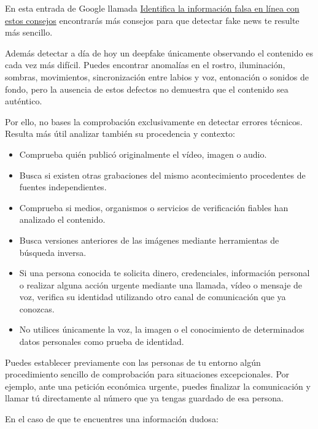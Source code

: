 \documentclass[
  spanish,
  a4paper,
  openany]{book}
\begin{document}
En esta entrada de Google llamada \href{https://blog.google/products-and-platforms/products/news/consejos-verificacion-hechos/}{Identifica la información falsa en línea con estos consejos} encontrarás más consejos para que detectar fake news te resulte más sencillo.

Además detectar a día de hoy un deepfake únicamente observando el contenido es cada vez más difícil. Puedes encontrar anomalías en el rostro, iluminación, sombras, movimientos, sincronización entre labios y voz, entonación o sonidos de fondo, pero la ausencia de estos defectos no demuestra que el contenido sea auténtico.

Por ello, no bases la comprobación exclusivamente en detectar errores técnicos. Resulta más útil analizar también su procedencia y contexto:

\begin{itemize}
\item
  Comprueba quién publicó originalmente el vídeo, imagen o audio.
\item
  Busca si existen otras grabaciones del mismo acontecimiento procedentes de fuentes independientes.
\item
  Comprueba si medios, organismos o servicios de verificación fiables han analizado el contenido.
\item
  Busca versiones anteriores de las imágenes mediante herramientas de búsqueda inversa.
\item
  Si una persona conocida te solicita dinero, credenciales, información personal o realizar alguna acción urgente mediante una llamada, vídeo o mensaje de voz, verifica su identidad utilizando otro canal de comunicación que ya conozcas.
\item
  No utilices únicamente la voz, la imagen o el conocimiento de determinados datos personales como prueba de identidad.
\end{itemize}

Puedes establecer previamente con las personas de tu entorno algún procedimiento sencillo de comprobación para situaciones excepcionales. Por ejemplo, ante una petición económica urgente, puedes finalizar la comunicación y llamar tú directamente al número que ya tengas guardado de esa persona.

En el caso de que te encuentres una información dudosa:
\end{document}
